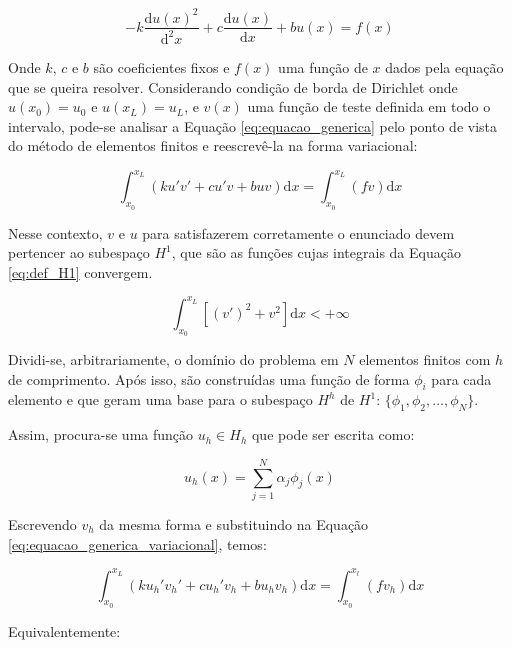 \begin{equation}
    -k \frac{\mathrm{d} u(x)^2 }{ \mathrm{d}^2 x} + c \frac{\mathrm{d} u(x)}{\mathrm{d} x} + b u(x) = f(x)
    \label{eq:equacao_generica}
\end{equation}

Onde $k$, $c$ e $b$ são coeficientes fixos e $f(x)$ uma função de $x$ dados pela equação que se queira resolver. 
Considerando condição de borda de Dirichlet onde $u(x_0)=u_0$ e $u(x_L)=u_L$, e $v(x)$ uma função de teste definida em todo o intervalo, pode-se analisar a Equação \ref{eq:equacao_generica} pelo ponto de vista do método de elementos finitos e reescrevê-la na forma variacional:

\begin{equation}
    \int_{x_0}^{x_L} ( ku' v' + cu' v + buv ) \mathrm{d}x = \int_{x_0}^{x_L} (fv) \mathrm{d}x
    \label{eq:equacao_generica_variacional}
\end{equation}

Nesse contexto, $v$ e $u$ para satisfazerem corretamente o enunciado devem pertencer ao subespaço $H^1$, que são as funções cujas integrais da Equação \ref{eq:def_H1} convergem. 

\begin{equation}
    \int_{x_0}^{x_L} \left[ (v')^2 + v^2 \right] \mathrm{d} x < + \infty
    \label{eq:def_H1}
\end{equation}

Dividi-se, arbitrariamente, o domínio do problema em $N$ elementos finitos com $h$ de comprimento. 
Após isso, são construídas uma função de forma $\phi_i$ para cada elemento e que geram uma base para o subespaço $H^h$ de $H^1$: 
$\{ \phi_1, \phi_2, \dots , \phi_N \}$.

Assim, procura-se uma função $u_h \in H_h$ que pode ser escrita como:

\begin{equation}
    u_h(x) = \sum_{j=1}^{N} \alpha_j \phi_j(x)
    \label{eq:def_u_h}
\end{equation}

Escrevendo $v_h$ da mesma forma e substituindo na Equação \ref{eq:equacao_generica_variacional}, temos:

\begin{equation*}
    \int_{x_0}^{x_L} ( k u_h' v_h' + c u_h' v_h + b u_h v_h ) \mathrm{d} x = \int_{x_0}^{x_l} (fv_h) \mathrm{d} x
\end{equation*}

Equivalentemente:

